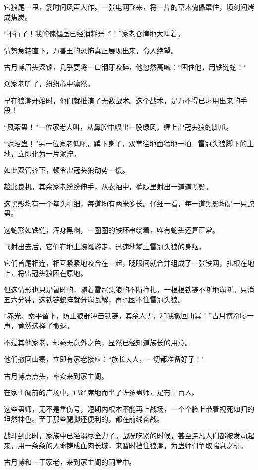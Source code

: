 \begin{this_body}
它狼尾一甩，霎时间风声大作。一张电网飞来，将一片的草木傀儡罩住，顷刻间烤成焦炭。

“不行了！我的傀儡蛊已经消耗光了！”家老仓惶地大叫着。

情势急转直下，万兽王的恐怖真正展现出来，令人绝望。

古月博眉头深锁，几乎要将一口钢牙咬碎，他忽然高喊：“困住他，用铁链蛇！”

众家老听了，纷纷心中凛然。

早在狼潮开始时，他们就推演了无数战术。这个战术，是万不得已才用出来的手段！

“风索蛊！”一位家老大叫，从鼻腔中喷出一股绿风，缠上雷冠头狼的脚爪。

“泥沼蛊！”另一位家老低吼，蹲下身子，双掌往地面猛地一拍。雷冠头狼脚下的土地，立即化为一片泥泞。

如此双管齐下，顿令雷冠头狼动势一缓。

趁此良机，其余家老纷纷伸手，从衣袖中，裤腿里射出一道道黑影。

这黑影均有一个拳头粗细，每道均有两米多长。仔细一看，每一道黑影均是一只蛇蛊。

这蛇形如铁链，浑身黑幽，一圈圈的铁环串绕着，唯有蛇头还算正常。

飞射出去后，它们在地上蜿蜒游走，迅速地攀上雷冠头狼的身躯。

它们首尾相连，相互紧紧地咬合在一起，眨眼间就合并组成了一张铁网，扎根在地上，将雷冠头狼困在原地。

但这情形也只是暂时的，随着雷冠头狼的不断挣扎，一根根铁链不断地崩断。只消五六分钟，这铁链蛇阵就分崩瓦解，再也困不住雷冠头狼。

“赤光、索平留下，防止狼群冲击铁链，其余人等，和我撤回山寨！”古月博冷喝一声，竟然选择了撤退。

不过其他家老，却毫无意外之色，显然已经知道族长的用意。

他们撤回山寨，立即有家老接应：“族长大人，一切都准备好了！”

古月博点点头，率众来到家主阁。

在家主阁前的广场中，已经席地而坐了许多蛊师，足有上百人。

这些蛊师，无不是重伤号，短期内根本不能再上战场，一个个脸上带着视死如归的坦然神色。至于那些腿脚还便利的，都在前线奋战。

战斗到此时，家族中已经竭尽全力了。战况吃紧的时候，甚至连凡人们都被发动起来，用一条条的人命铸成血肉长城，来暂时挡住狼潮，为蛊师们争取喘息之机。

古月博和一干家老，来到家主阁的祠堂中。


\end{this_body}
